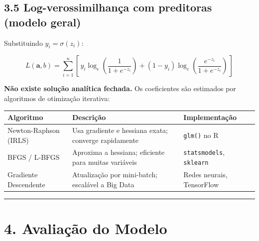 \documentclass[
  letterpaper,
  DIV=11,
  numbers=noendperiod]{scrartcl}
\newcounter{none} %
\begin{document}
\subsection{3.5 Log-verossimilhança com preditoras (modelo
geral)}\label{log-verossimilhanuxe7a-com-preditoras-modelo-geral}

Substituindo \(\hat{y}_i = \sigma(z_i)\):

\[L(\mathbf{a}, b) = \sum_{i=1}^{n} \left[\, y_i \log_e\!\left(\frac{1}{1+e^{-z_i}}\right) + (1-y_i)\log_e\!\left(\frac{e^{-z_i}}{1+e^{-z_i}}\right) \,\right]\]

\textbf{Não existe solução analítica fechada.} Os coeficientes são
estimados por algoritmos de otimização iterativa:

{\def\LTcaptype{none} %
\begin{longtable}[]{@{}
  >{\raggedright\arraybackslash}p{}
  >{\raggedright\arraybackslash}p{}
  >{\raggedright\arraybackslash}p{}@{}}
\toprule\noalign{}
\begin{minipage}[b]{\linewidth}\raggedright
Algoritmo
\end{minipage} & \begin{minipage}[b]{\linewidth}\raggedright
Descrição
\end{minipage} & \begin{minipage}[b]{\linewidth}\raggedright
Implementação
\end{minipage} \\
\midrule\noalign{}
\endhead
\bottomrule\noalign{}
\endlastfoot
Newton-Raphson (IRLS) & Usa gradiente e hessiana exata; converge
rapidamente & \texttt{glm()} no R \\
BFGS / L-BFGS & Aproxima a hessiana; eficiente para muitas variáveis &
\texttt{statsmodels}, \texttt{sklearn} \\
Gradiente Descendente & Atualização por mini-batch; escalável a Big Data
& Redes neurais, TensorFlow \\
\end{longtable}
}

\begin{center}\rule{0.5\linewidth}{0.5pt}\end{center}

\section{4. Avaliação do Modelo}\label{avaliauxe7uxe3o-do-modelo}
\end{document}
